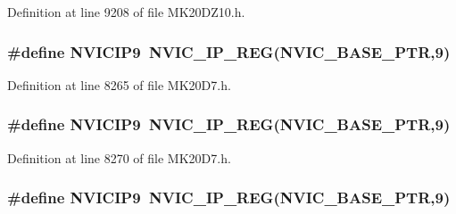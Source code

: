 Definition at line 9208 of file M\+K20\+D\+Z10.\+h.

\subsubsection[{\texorpdfstring{N\+V\+I\+C\+I\+P9}{NVICIP9}}]{\setlength{\rightskip}{0pt plus 5cm}\#define N\+V\+I\+C\+I\+P9~{\bf N\+V\+I\+C\+\_\+\+I\+P\+\_\+\+R\+EG}({\bf N\+V\+I\+C\+\_\+\+B\+A\+S\+E\+\_\+\+P\+TR},9)}\hypertarget{group___n_v_i_c___register___accessor___macros_ga7a5c2dd3250615825faaa5a65bcd67b6}{}\label{group___n_v_i_c___register___accessor___macros_ga7a5c2dd3250615825faaa5a65bcd67b6}


Definition at line 8265 of file M\+K20\+D7.\+h.

\subsubsection[{\texorpdfstring{N\+V\+I\+C\+I\+P9}{NVICIP9}}]{\setlength{\rightskip}{0pt plus 5cm}\#define N\+V\+I\+C\+I\+P9~{\bf N\+V\+I\+C\+\_\+\+I\+P\+\_\+\+R\+EG}({\bf N\+V\+I\+C\+\_\+\+B\+A\+S\+E\+\_\+\+P\+TR},9)}\hypertarget{group___n_v_i_c___register___accessor___macros_ga7a5c2dd3250615825faaa5a65bcd67b6}{}\label{group___n_v_i_c___register___accessor___macros_ga7a5c2dd3250615825faaa5a65bcd67b6}


Definition at line 8270 of file M\+K20\+D7.\+h.

\subsubsection[{\texorpdfstring{N\+V\+I\+C\+I\+P9}{NVICIP9}}]{\setlength{\rightskip}{0pt plus 5cm}\#define N\+V\+I\+C\+I\+P9~{\bf N\+V\+I\+C\+\_\+\+I\+P\+\_\+\+R\+EG}({\bf N\+V\+I\+C\+\_\+\+B\+A\+S\+E\+\_\+\+P\+TR},9)}\hypertarget{group___n_v_i_c___register___accessor___macros_ga7a5c2dd3250615825faaa5a65bcd67b6}{}\label{group___n_v_i_c___register___accessor___macros_ga7a5c2dd3250615825faaa5a65bcd67b6}


